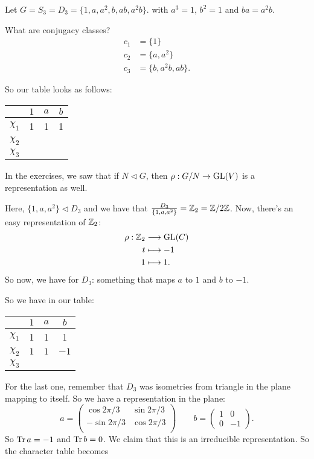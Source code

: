 \begin{eg}
    Let $G = S_3 = D_3 = \{1, a, a^2, b, ab, a^2b\} $. with $a^3 = 1$, $b^2 = 1$ and $ba = a^2 b$.

    What are conjugacy classes?
    \begin{align*}
        c_1 &= \{1\} \\
        c_2 &= \{a, a^2\} \\
        c_3 &= \{b, a^2b, ab\} 
    .\end{align*}

    So our table looks as follows:

    \begin{center}
    \begin{tabular}{cccc}
        & $1$ &  $a$ &  $b$ \\ \hline
        $\chi_{1}$ & 1& 1 & 1\\
        $\chi_{2}$ & & \\
        $\chi_{3}$ & & \\
    \end{tabular}
    \end{center}

    In the exercises, we saw that if $N \triangleleft G$, then $\rho: G / N \to  \operatorname{GL}(V)$ is a representation as well.

    Here, $\{1, a, a^2\} \triangleleft D_3$ and we have that $ \frac{D_3}{\{1, a, a^2\} } = \mathbb{Z}_2 = \mathbb{Z} / 2\mathbb{Z}$.
    Now, there's an easy representation of $\mathbb{Z}_2$:
    \begin{align*}
        \rho: \mathbb{Z}_2 &\longrightarrow \operatorname{GL}(C)  \\
        t &\longmapsto -1\\
        1 &\longmapsto 1
    .\end{align*}
    So now, we have for $D_3$: something that maps $a$ to $1$ and  $b$ to  $-1$.

    So we have in our table:

\begin{center}
    \begin{tabular}{cccc}
        & $1$ &  $a$ &  $b$ \\ \hline
        $\chi_{1}$ & 1& 1 & 1\\
        $\chi_{2}$ &$1$ & $1$& $-1$\\
        $\chi_{3}$ & & \\
    \end{tabular}
    \end{center}

    For the last one, remember that $D_3$ was isometries from triangle in the plane mapping to itself.
    So we have a representation in the plane:
    \[
    a = \begin{pmatrix}
        \cos 2 \pi / 3 & \sin 2 \pi /3 \\
        -\sin 2 \pi /3  & \cos 2 \pi / 3 \\
    \end{pmatrix}
    \qquad b = \begin{pmatrix}
        1 & 0 \\
        0 & -1
    \end{pmatrix}
    .\] 
    So $\operatorname{Tr} a = -1$ and  $\operatorname{Tr} b  = 0$. We claim that this is an irreducible representation. So the character table becomes


\end{eg}

